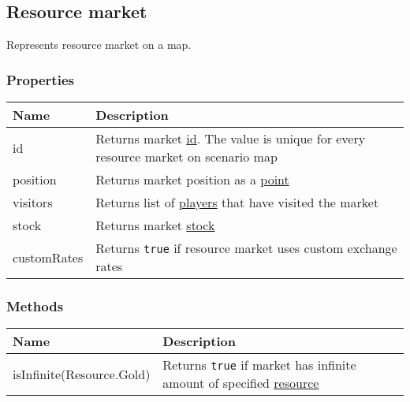 \subsection{Resource market}
\label{ResourceMarket}
Represents resource market on a map.
\subsubsection{Properties}
\begin{center}
\begin{tabularx}{\linewidth}{| l | X |}
\hline
\textbf{Name} & \textbf{Description} \\
\hline
id & Returns market \hyperref[Id]{id}. The value is unique for every resource market on scenario map\\
\hline
position & Returns market position as a \hyperref[Point]{point}\\
\hline
visitors & Returns list of \hyperref[Player]{players} that have visited the market\\
\hline
stock & Returns market \hyperref[Currency]{stock}\\
\hline
customRates & Returns \texttt{true} if resource market uses custom exchange rates\\
\hline
\end{tabularx}
\end{center}

\subsubsection{Methods}
\begin{center}
\begin{tabularx}{\linewidth}{| l | X |}
\hline
\textbf{Name} & \textbf{Description} \\
\hline
isInfinite(Resource.Gold) & Returns \texttt{true} if market has infinite amount of specified \hyperref[Resource]{resource}\\
\hline
\end{tabularx}
\end{center}

